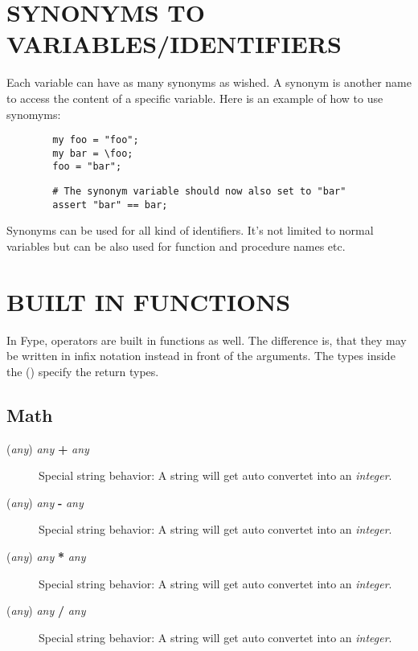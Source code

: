 \section{SYNONYMS TO VARIABLES/IDENTIFIERS\label{SYNONYMS_TO_VARIABLES_IDENTIFIERS}}


Each variable can have as many synonyms as wished. A synonym is another name to access the content of a specific variable. Here is an example of how to use synomyms:

\begin{verbatim}
        my foo = "foo";
        my bar = \foo;
        foo = "bar";
\end{verbatim}
\begin{verbatim}
        # The synonym variable should now also set to "bar"
        assert "bar" == bar;
\end{verbatim}


Synonyms can be used for all kind of identifiers. It's not limited to normal variables but can be also used for function and procedure names etc.

\section{BUILT IN FUNCTIONS\label{BUILT_IN_FUNCTIONS}}


In Fype, operators are built in functions as well. The difference is, that they may be written in infix notation instead in front of the arguments. The types inside the () specify the return types.

\subsection*{Math\label{Math}}
\begin{description}

\item[{(\textit{any}) \textit{any} \textbf{+} \textit{any}}] \mbox{}

Special string behavior: A string will get auto convertet into an \textit{integer}.


\item[{(\textit{any}) \textit{any} \textbf{-} \textit{any}}] \mbox{}

Special string behavior: A string will get auto convertet into an \textit{integer}.


\item[{(\textit{any}) \textit{any} \textbf{*} \textit{any}}] \mbox{}

Special string behavior: A string will get auto convertet into an \textit{integer}.


\item[{(\textit{any}) \textit{any} \textbf{/} \textit{any}}] \mbox{}

Special string behavior: A string will get auto convertet into an \textit{integer}.

\end{description}

